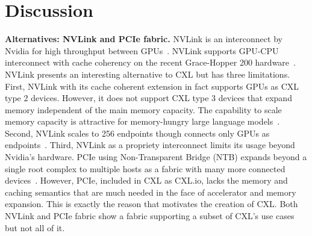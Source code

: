 \section{Discussion}
\label{sec:discussion}
\noindent \textbf{Alternatives: NVLink and PCIe fabric.}
%
% 
NVLink is an interconnect by Nvidia for high throughput between GPUs~\cite{nvlink}. NVLink supports GPU-CPU interconnect with cache coherency on the recent Grace-Hopper 200 hardware~\cite{dgx-gh200}. 
%
NVLink presents an interesting alternative to CXL but has three limitations. 
%
First, NVLink with its cache coherent extension in fact supports GPUs as CXL type 2 devices. However, it does not support CXL type 3 devices that expand memory independent of the main memory capacity. The capability to scale memory capacity is attractive for memory-hungry large language models~\cite{gpt3:neurips:2020,llama:arxiv:2023}. 
%
Second, NVLink scales to 256 endpoints though connects only GPUs as endpoints~\cite{dgx-superpod}. 
Third, NVLink as a propriety interconnect limits its usage beyond Nvidia's hardware.
%
PCIe using Non-Transparent Bridge (NTB) expands beyond a single root complex to multiple hosts as a fabric with many more connected devices~\cite{pcie-spec}. 
%
%
%
However, PCIe, included in CXL as CXL.io, lacks the memory and caching semantics that are much needed in the face of accelerator and memory expansion. 
%
This is exactly the reason that motivates the creation of CXL.
%
Both NVLink and PCIe fabric show a fabric supporting a subset of CXL's use cases but not all of it.    
%

